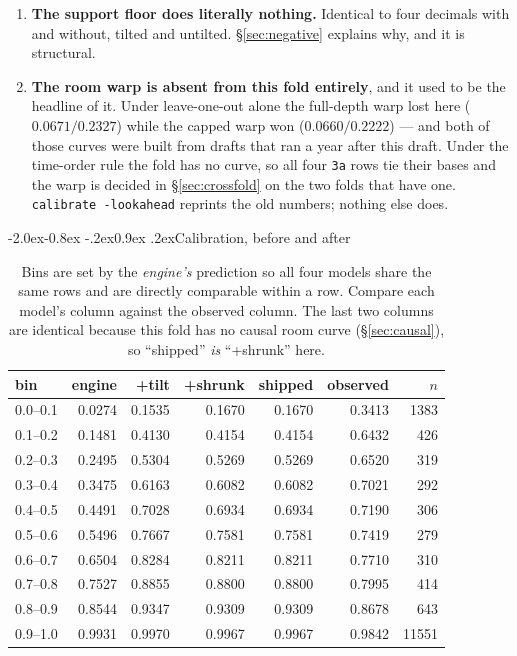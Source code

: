 \documentclass[10pt,a4paper]{article}
\makeatletter
\theoremstyle{plain}
\theoremstyle{definition}
\theoremstyle{remark}
\newcommand{\code}[1]{\texttt{\small #1}}
\renewcommand\subsection{\@startsection{subsection}{2}{\z@}%
  {-2.0ex\@plus -0.8ex \@minus -.2ex}{0.9ex \@plus .2ex}{\normalfont\large\bfseries}}
\makeatother
\begin{document}
\begin{enumerate}
\item \textbf{The support floor does literally nothing.} Identical to four decimals with
and without, tilted and untilted. \S\ref{sec:negative} explains why, and it is
structural.

\item \textbf{The room warp is absent from this fold entirely}, and it used to be the
headline of it. Under leave-one-out alone the full-depth warp lost here ($0.0671 / 0.2327$)
while the capped warp won ($0.0660 / 0.2222$) --- and both of those curves were built from
drafts that ran a year after this draft. Under the time-order rule the fold has no curve, so
all four \code{3a} rows tie their bases and the warp is decided in
\S\ref{sec:crossfold} on the two folds that have one. \code{calibrate -lookahead} reprints
the old numbers; nothing else does.
\end{enumerate}

\subsection{Calibration, before and after}

\begin{table}[htbp]
\centering
\small
\begin{tabular}{lrrrrrr}
\toprule
bin & engine & +tilt & +shrunk & shipped & observed & $n$ \\
\midrule
0.0--0.1 & 0.0274 & 0.1535 & 0.1670 & 0.1670 & 0.3413 & 1383 \\
0.1--0.2 & 0.1481 & 0.4130 & 0.4154 & 0.4154 & 0.6432 & 426 \\
0.2--0.3 & 0.2495 & 0.5304 & 0.5269 & 0.5269 & 0.6520 & 319 \\
0.3--0.4 & 0.3475 & 0.6163 & 0.6082 & 0.6082 & 0.7021 & 292 \\
0.4--0.5 & 0.4491 & 0.7028 & 0.6934 & 0.6934 & 0.7190 & 306 \\
0.5--0.6 & 0.5496 & 0.7667 & 0.7581 & 0.7581 & 0.7419 & 279 \\
0.6--0.7 & 0.6504 & 0.8284 & 0.8211 & 0.8211 & 0.7710 & 310 \\
0.7--0.8 & 0.7527 & 0.8855 & 0.8800 & 0.8800 & 0.7995 & 414 \\
0.8--0.9 & 0.8544 & 0.9347 & 0.9309 & 0.9309 & 0.8678 & 643 \\
0.9--1.0 & 0.9931 & 0.9970 & 0.9967 & 0.9967 & 0.9842 & 11551 \\
\bottomrule
\end{tabular}
\caption{Bins are set by the \emph{engine's} prediction so all four models share the
same rows and are directly comparable within a row. Compare each model's column against
the observed column. The last two columns are identical because this fold has no causal
room curve (\S\ref{sec:causal}), so ``shipped'' \emph{is} ``+shrunk'' here.}
\label{tab:relcompare}
\end{table}
\end{document}

